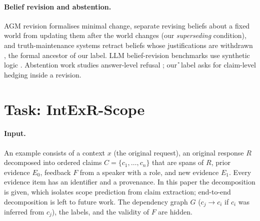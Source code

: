 \paragraph{Belief revision and abstention.}
AGM revision \citep{alchourron1985agm} formalises minimal change, \citet{katsuno1991update} separate revising beliefs about a fixed world from updating them after the world changes (our \emph{superseding} condition), and truth-maintenance systems retract beliefs whose justifications are withdrawn \citep{doyle1979tms,dekleer1986atms}, the formal ancestor of our \Pp{} label. LLM belief-revision benchmarks use synthetic logic \citep{wilie2024beliefr}. Abstention work studies answer-level refusal \citep{kirichenko2025abstentionbench}; our \U{} label asks for claim-level hedging inside a revision.

\section{Task: IntExR-Scope}
\label{sec:task}
\paragraph{Input.} An example consists of a context $x$ (the original request), an original response $R$ decomposed into ordered claims $C=\{c_1,\dots,c_n\}$ that are spans of $R$, prior evidence $E_0$, feedback $F$ from a speaker with a role, and new evidence $E_1$. Every evidence item has an identifier and a provenance. In this paper the decomposition is given, which isolates scope prediction from claim extraction; end-to-end decomposition is left to future work. The dependency graph $G$ ($c_j\!\to\!c_i$ if $c_i$ was inferred from $c_j$), the labels, and the validity of $F$ are hidden.

